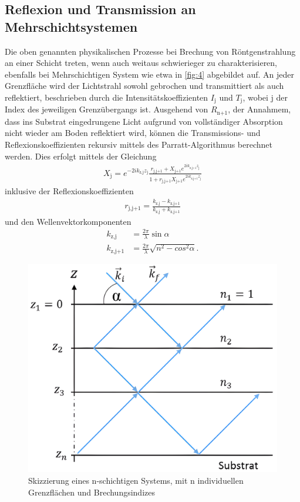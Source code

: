 \documentclass[12pt]{article}
\begin{document}
\subsection{Reflexion und Transmission an Mehrschichtsystemen}\label{subsec:multilevel}
Die oben genannten physikalischen Prozesse bei Brechung von Röntgenstrahlung an einer Schicht treten, wenn auch weitaus schwierieger zu charakterisieren, ebenfalls bei Mehrschichtigen System wie etwa in \autoref{fig:4} abgebildet auf.
An jeder Grenzfläche wird der Lichtstrahl sowohl gebrochen und transmittiert als auch reflektiert, beschrieben durch die Intensitätskoeffizienten $I_\text{j}$ und $T_\text{j}$, wobei $\text{j}$ der Index des jeweiligen Grenzübergangs ist.
Ausgehend von $R_\text{n+1}$, der Annahmem, dass ins Substrat eingedrungene Licht aufgrund von vollständiger Absorption nicht wieder am Boden reflektiert wird, können die Transmissions- und Reflexionskoeffizienten rekursiv mittels des Parratt-Algorithmus berechnet werden.
Dies erfolgt mittels der Gleichung
\begin{align}
  X_\text{j} = e^{-2ik_\text{z,j}z_\text{j}}\frac{r_\text{j,j+1}+X_\text{j+1}e^{2ik_\text{z,j+1}z_\text{j}}}{1+r_\text{j,j+1}X_\text{j+1}e^{2ik_\text{z,j+1}z_\text{j}}}
\end{align}
inklusive der Reflexionskoeffizienten
\begin{align}
  r_\text{j,j+1}=\frac{k_\text{z,j}-k_\text{z,j+1}}{k_\text{z,j}+k_\text{z,j+1}}
\end{align}
und den Wellenvektorkomponenten
\begin{align}
  k_\text{z,j}&=\frac{2\pi}{\lambda}\sin{\alpha}\\
  k_\text{z,j+1}&=\frac{2\pi}{\lambda}\sqrt{n^2-cos^2{\alpha}}\text{.}
\end{align}
\begin{figure}[H]
  \centering
  \includegraphics[scale=0.12]{Ressourcen/mehrschicht.png}
  \caption{Skizzierung eines n-schichtigen Systems, mit n individuellen\\ Grenzflächen und Brechungsindizes\cite{juwi2015}}\label{fig:4}
\end{figure}
\end{document}
